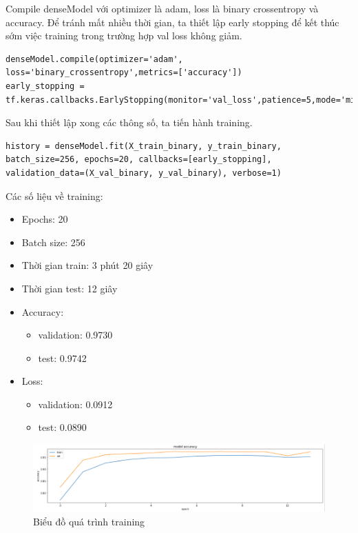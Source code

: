 \documentclass{article}
\begin{document}
Compile denseModel với optimizer là adam, loss là binary crossentropy và accuracy. Để tránh mất nhiều thời gian, ta thiết lập early stopping để kết thúc sớm việc training trong trường hợp val loss không giảm.

\begin{verbatim}
denseModel.compile(optimizer='adam', loss='binary_crossentropy',metrics=['accuracy'])
early_stopping = tf.keras.callbacks.EarlyStopping(monitor='val_loss',patience=5,mode='min')
\end{verbatim}

Sau khi thiết lập xong các thông số, ta tiến hành training.

\begin{verbatim}
history = denseModel.fit(X_train_binary, y_train_binary, batch_size=256, epochs=20, callbacks=[early_stopping], validation_data=(X_val_binary, y_val_binary), verbose=1)
\end{verbatim}

Các số liệu về training:
\begin{itemize}
	\item Epochs: 20
	\item Batch size: 256
	\item Thời gian train: 3 phút 20 giây
	\item Thời gian test: 12 giây
	\item Accuracy:
	      \begin{itemize}
		      \item validation: 0.9730
		      \item test: 0.9742
	      \end{itemize}
	\item Loss:
	      \begin{itemize}
		      \item validation: 0.0912
		      \item test: 0.0890
	      \end{itemize}
\end{itemize}

\begin{figure}[H]
	\centering
	\includegraphics[width=6in]{images/ky1.png}
	\caption{Biểu đồ quá trình training}
\end{figure}
\end{document}
